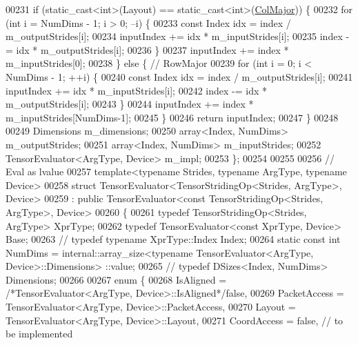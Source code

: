 \begin{DoxyCode}
00231     \textcolor{keywordflow}{if} (static\_cast<int>(Layout) == static\_cast<int>(\hyperlink{group__enums_ggaacded1a18ae58b0f554751f6cdf9eb13a0cbd4bdd0abcfc0224c5fcb5e4f6669a}{ColMajor})) \{
00232       \textcolor{keywordflow}{for} (\textcolor{keywordtype}{int} i = NumDims - 1; i > 0; --i) \{
00233         \textcolor{keyword}{const} Index idx = index / m\_outputStrides[i];
00234         inputIndex += idx * m\_inputStrides[i];
00235         index -= idx * m\_outputStrides[i];
00236       \}
00237       inputIndex += index * m\_inputStrides[0];
00238     \} \textcolor{keywordflow}{else} \{  \textcolor{comment}{// RowMajor}
00239       \textcolor{keywordflow}{for} (\textcolor{keywordtype}{int} i = 0; i < NumDims - 1; ++i) \{
00240         \textcolor{keyword}{const} Index idx = index / m\_outputStrides[i];
00241         inputIndex += idx * m\_inputStrides[i];
00242         index -= idx * m\_outputStrides[i];
00243       \}
00244       inputIndex += index * m\_inputStrides[NumDims-1];
00245     \}
00246     \textcolor{keywordflow}{return} inputIndex;
00247   \}
00248 
00249   Dimensions m\_dimensions;
00250   array<Index, NumDims> m\_outputStrides;
00251   array<Index, NumDims> m\_inputStrides;
00252   TensorEvaluator<ArgType, Device> m\_impl;
00253 \};
00254 
00255 
00256 \textcolor{comment}{// Eval as lvalue}
00257 \textcolor{keyword}{template}<\textcolor{keyword}{typename} Str\textcolor{keywordtype}{id}es, \textcolor{keyword}{typename} ArgType, \textcolor{keyword}{typename} Device>
00258 \textcolor{keyword}{struct }TensorEvaluator<TensorStridingOp<Strides, ArgType>, Device>
00259     : \textcolor{keyword}{public} TensorEvaluator<const TensorStridingOp<Strides, ArgType>, Device>
00260 \{
00261   \textcolor{keyword}{typedef} TensorStridingOp<Strides, ArgType> XprType;
00262   \textcolor{keyword}{typedef} TensorEvaluator<const XprType, Device> Base;
00263   \textcolor{comment}{//  typedef typename XprType::Index Index;}
00264   \textcolor{keyword}{static} \textcolor{keyword}{const} \textcolor{keywordtype}{int} NumDims = internal::array\_size<typename TensorEvaluator<ArgType, Device>::Dimensions>
      ::value;
00265   \textcolor{comment}{//  typedef DSizes<Index, NumDims> Dimensions;}
00266 
00267   \textcolor{keyword}{enum} \{
00268     IsAligned = \textcolor{comment}{/*TensorEvaluator<ArgType, Device>::IsAligned*/}\textcolor{keyword}{false},
00269     PacketAccess = TensorEvaluator<ArgType, Device>::PacketAccess,
00270     Layout = TensorEvaluator<ArgType, Device>::Layout,
00271     CoordAccess = \textcolor{keyword}{false},  \textcolor{comment}{// to be implemented}

\end{DoxyCode}
